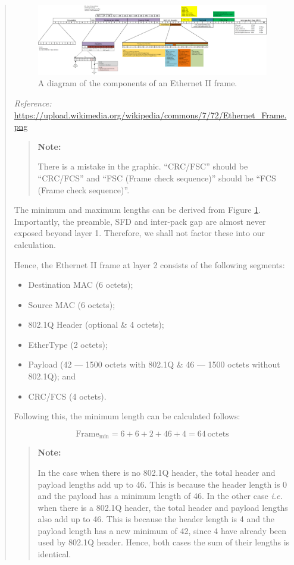\documentclass{article}
\newenvironment{ans}
   {\fbox{Answer}\begin{quote}\nopagebreak}
   {\end{quote}}
\newcommand\Refer[1]{
   \begin{center}
      {\small\textit{Reference:} \url{#1}}
   \end{center}
}%
\newcommand\ie{\emph{i.e.}}
\newenvironment{note}{%
    \begin{quote}
    \textbf{Note:}%
}{%
    \end{quote}%
}
\begin{document}
\begin{ans}

\begin{figure}[H]
   \centering
   \includegraphics[width=16cm]{data/q4.2-ethernet-diagram.png}
   \caption{A diagram of the components of an Ethernet II frame.}
   \label{fig:eth2-frame}
\end{figure}

\Refer{https://upload.wikimedia.org/wikipedia/commons/7/72/Ethernet_Frame.png}

\begin{note}
There is a mistake in the graphic. ``CRC/FSC'' should be
``CRC/FCS'' and ``FSC (Frame check sequence)'' should be ``FCS
(Frame check sequence)''.
\end{note}

The minimum and maximum lengths can be derived from Figure
\ref{fig:eth2-frame}. Importantly, the preamble, SFD and
inter-pack gap are almost never exposed beyond layer 1.
Therefore, we shall not factor these into our calculation.

Hence, the Ethernet II frame at layer 2 consists of the
following segments:

\begin{itemize}
\item Destination MAC (6 octets);
\item Source MAC (6 octets);
\item 802.1Q Header (optional \& 4 octets);
\item EtherType (2 octets);
\item Payload (42 --- 1500 octets with 802.1Q \& 46 --- 1500
   octets without 802.1Q); and
\item CRC/FCS (4 octets).
\end{itemize}

Following this, the minimum length can be calculated follows:

$$
{\text{Frame}}_{\text{min}} = 6 + 6 + 2 + 46 + 4 = 64\ \text{octets}
$$

\begin{note}
In the case when there is no 802.1Q header, the total header and
payload lengths add up to 46. This is because the header length
is 0 and the payload has a minimum length of 46. In the other
case \ie{} when there is a 802.1Q header, the total header and
payload lengths also add up to 46. This is because the header
length is 4 and the payload length has a new minimum of 42,
since 4 have already been used by 802.1Q header. Hence, both
cases the sum of their lengths is identical.
\end{note}


\end{ans}
\end{document}
